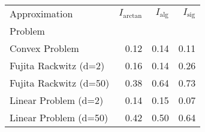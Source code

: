 \begin{tabular}{lrrr}
Approximation & $I_\text{arctan}$ & $I_\text{alg}$ & $I_\text{sig}$ \\
Problem &  &  &  \\
Convex Problem & 0.12 & 0.14 & 0.11 \\
\cline{1-4}
Fujita Rackwitz (d=2) & 0.16 & 0.14 & 0.26 \\
\cline{1-4}
Fujita Rackwitz (d=50) & 0.38 & 0.64 & 0.73 \\
\cline{1-4}
Linear Problem (d=2) & 0.14 & 0.15 & 0.07 \\
\cline{1-4}
Linear Problem (d=50) & 0.42 & 0.50 & 0.64 \\
\cline{1-4}
\end{tabular}
